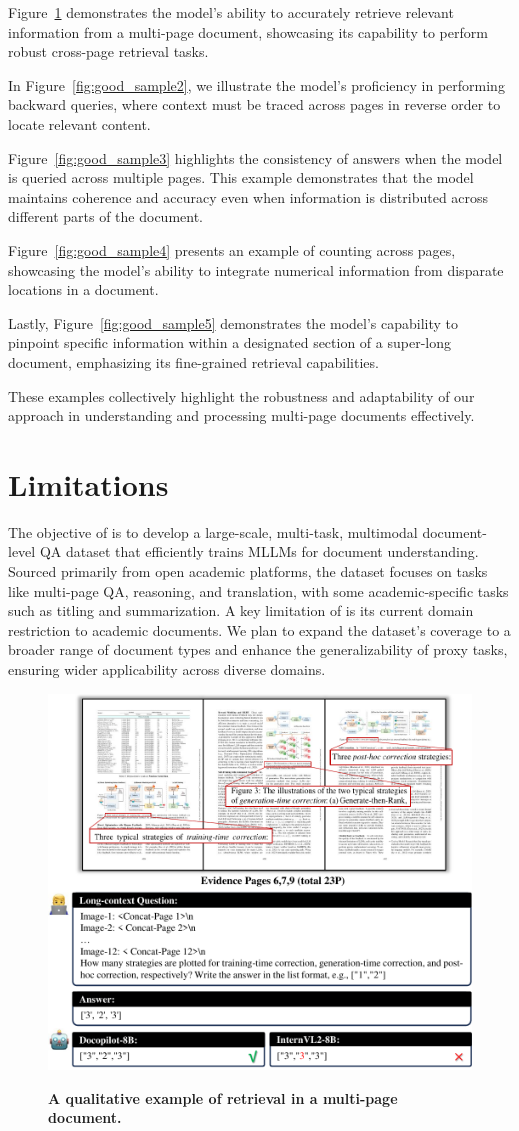 Figure~\ref{fig:good_sample1} demonstrates the model's ability to accurately retrieve relevant information from a multi-page document, showcasing its capability to perform robust cross-page retrieval tasks.

In Figure~\ref{fig:good_sample2}, we illustrate the model's proficiency in performing backward queries, where context must be traced across pages in reverse order to locate relevant content.

Figure~\ref{fig:good_sample3} highlights the consistency of answers when the model is queried across multiple pages. This example demonstrates that the model maintains coherence and accuracy even when information is distributed across different parts of the document.

Figure~\ref{fig:good_sample4} presents an example of counting across pages, showcasing the model's ability to integrate numerical information from disparate locations in a document. 

Lastly, Figure~\ref{fig:good_sample5} demonstrates the model's capability to pinpoint specific information within a designated section of a super-long document, emphasizing its fine-grained retrieval capabilities.

These examples collectively highlight the robustness and adaptability of our approach in understanding and processing multi-page documents effectively.

\section{Limitations}
The objective of \dataname is to develop a large-scale, multi-task, multimodal document-level QA dataset that efficiently trains MLLMs for document understanding. Sourced primarily from open academic platforms, the dataset focuses on tasks like multi-page QA, reasoning, and translation, with some academic-specific tasks such as titling and summarization. 
A key limitation of \dataname is its current domain restriction to academic documents. We plan to expand the dataset’s coverage to a broader range of document types and enhance the generalizability of proxy tasks, ensuring wider applicability across diverse domains.

\begin{figure}[]
    \centering
    {\includegraphics[width=0.65\linewidth]{figure/sample1.pdf}}
    \caption{\textbf{A qualitative example of retrieval in a multi-page document.}}
    \label{fig:good_sample1}
\end{figure}

